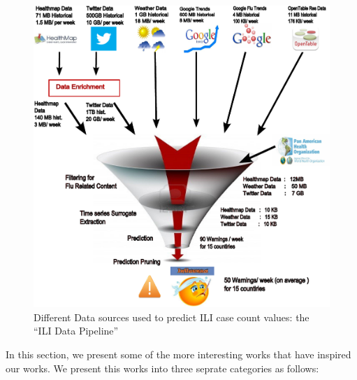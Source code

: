 \begin{figure}[t] \centering
    \includegraphics[scale=0.3]{fig/ili_data_pipeline.pdf}
    \caption{\label{fig:ili_data_pipeline} Different Data sources used to predict ILI case
    count values: the ``ILI Data Pipeline''}
 \end{figure}
 
 In this section, we present some of the more interesting works that have
inspired our works. We present this works into three seprate categories as follows: \\


